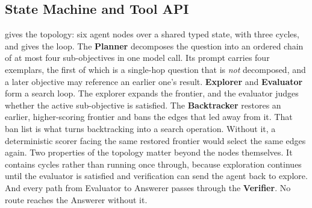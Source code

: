 \subsection{State Machine and Tool API}\label{sec:statemachine}

 gives the topology: six agent nodes over a
shared typed state, with three cycles, and  gives the
loop. The \textbf{Planner} decomposes the question into an ordered chain
of at most four sub-objectives in one model call. Its prompt carries
four exemplars, the first of which is a single-hop question that is
\emph{not} decomposed, and a later objective may reference an earlier
one's result. \textbf{Explorer} and \textbf{Evaluator} form a search
loop. The explorer expands the frontier, and the evaluator judges
whether the active sub-objective is satisfied. The \textbf{Backtracker}
restores an earlier, higher-scoring frontier and bans the edges that led
away from it. That ban list is what turns backtracking into a search
operation. Without it, a deterministic scorer facing the same restored
frontier would select the same edges again. Two properties of the
topology matter beyond the nodes themselves. It contains cycles rather
than running once through, because exploration continues until the
evaluator is satisfied and verification can send the agent back to
explore. And every path from Evaluator to Answerer passes through the
\textbf{Verifier}. No route reaches the Answerer without it.

